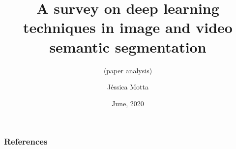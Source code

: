 \documentclass[aspectratio=169]{beamer} %
\title[DP in semantic segmentation]{A survey on deep learning techniques in image and video semantic segmentation}
\subtitle{(paper analysis)}
\date{June, 2020}
\author[J\'{e}ssica Motta]{J\'{e}ssica Motta}
\institute[SENAI CIMATEC]{SENAI CIMATEC}
\begin{document}
\begin{frame}
  \titlepage
\end{frame}










    
    \begin{frame}[t, allowframebreaks]
        \frametitle{References}
        
        
    \end{frame}
\end{document}
